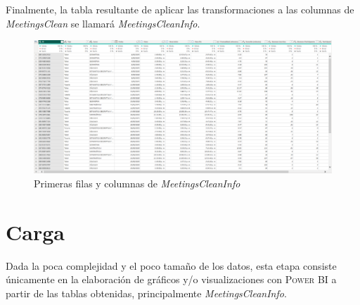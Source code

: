 \documentclass[11pt,a4paper]{book}
\theoremstyle{definition}%
\begin{document}
                Finalmente, la tabla resultante de aplicar las transformaciones a las columnas de \textit{MeetingsClean} se llamará \textit{MeetingsCleanInfo}.
                \begin{figure}[H]
                    \centering
                    \includegraphics[width=1\textwidth]{Sources/MeetingsCleanInfo_Head.png}
                    \caption{Primeras filas y columnas de \textit{MeetingsCleanInfo}}
                    \label{fig:meetingscleaninfo_head}
                \end{figure}
            \section{Carga}
                Dada la poca complejidad y el poco tamaño de los datos, esta etapa consiste únicamente en la elaboración de gráficos y/o visualizaciones con \textsc{Power BI} a partir de las tablas obtenidas, principalmente \textit{MeetingsCleanInfo}.
\end{document}
